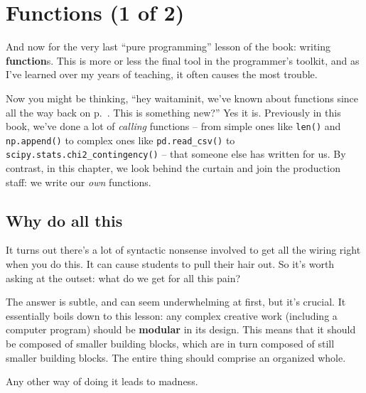 
\chapter{Functions (1 of 2)}
\label{ch:functions}


And now for the very last ``pure programming'' lesson of the book: writing
\textbf{function}s. This is more or less the final tool in the programmer's
toolkit, and as I've learned over my years of teaching, it often causes the
most trouble.

Now you might be thinking, ``hey waitaminit, we've known about functions since
all the way back on p.~\pageref{function}. This is something new?'' Yes it is.
Previously in this book, we've done a lot of \textit{calling} functions -- from
simple ones like \texttt{len()} and \texttt{np.append()} to complex ones like
\texttt{pd.read\_csv()} to \texttt{scipy.stats.chi2\_contingency()} -- that
someone else has written for us. By contrast, in this chapter, we look behind
the curtain and join the production staff: we write our \textit{own} functions.

\section{Why do all this}

It turns out there's a lot of syntactic nonsense involved to get all the wiring
right when you do this. It can cause students to pull their hair out. So it's
worth asking at the outset: what do we get for all this pain?


The answer is subtle, and can seem underwhelming at first, but it's crucial. It
essentially boils down to this lesson: any complex creative work (including a
computer program) should be \textbf{modular} in its design. This means that it
should be composed of smaller building blocks, which are in turn composed of
still smaller building blocks. The entire thing should comprise an organized
whole.

Any other way of doing it leads to madness.


